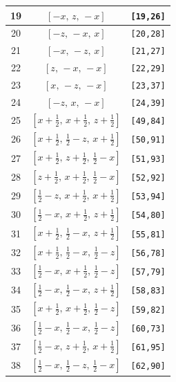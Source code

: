 \documentclass[fleqn,8pt]{jsarticle}
\begin{document}
\begin{longtable}{ccc}
19 & $\left[ - x,\, z,\, - x \right]$ & {\tt [19,26]} \\ \hline
20 & $\left[ - z,\, - x,\, x \right]$ & {\tt [20,28]} \\ \hline
21 & $\left[ - x,\, - z,\, x \right]$ & {\tt [21,27]} \\ \hline
22 & $\left[ z,\, - x,\, - x \right]$ & {\tt [22,29]} \\ \hline
23 & $\left[ x,\, - z,\, - x \right]$ & {\tt [23,37]} \\ \hline
24 & $\left[ - z,\, x,\, - x \right]$ & {\tt [24,39]} \\ \hline
25 & $\left[ x + \frac{1}{2},\, x + \frac{1}{2},\, z + \frac{1}{2} \right]$ & {\tt [49,84]} \\ \hline
26 & $\left[ x + \frac{1}{2},\, \frac{1}{2} - z,\, x + \frac{1}{2} \right]$ & {\tt [50,91]} \\ \hline
27 & $\left[ x + \frac{1}{2},\, z + \frac{1}{2},\, \frac{1}{2} - x \right]$ & {\tt [51,93]} \\ \hline
28 & $\left[ z + \frac{1}{2},\, x + \frac{1}{2},\, \frac{1}{2} - x \right]$ & {\tt [52,92]} \\ \hline
29 & $\left[ \frac{1}{2} - z,\, x + \frac{1}{2},\, x + \frac{1}{2} \right]$ & {\tt [53,94]} \\ \hline
30 & $\left[ \frac{1}{2} - x,\, x + \frac{1}{2},\, z + \frac{1}{2} \right]$ & {\tt [54,80]} \\ \hline
31 & $\left[ x + \frac{1}{2},\, \frac{1}{2} - x,\, z + \frac{1}{2} \right]$ & {\tt [55,81]} \\ \hline
32 & $\left[ x + \frac{1}{2},\, \frac{1}{2} - x,\, \frac{1}{2} - z \right]$ & {\tt [56,78]} \\ \hline
33 & $\left[ \frac{1}{2} - x,\, x + \frac{1}{2},\, \frac{1}{2} - z \right]$ & {\tt [57,79]} \\ \hline
34 & $\left[ \frac{1}{2} - x,\, \frac{1}{2} - x,\, z + \frac{1}{2} \right]$ & {\tt [58,83]} \\ \hline
35 & $\left[ x + \frac{1}{2},\, x + \frac{1}{2},\, \frac{1}{2} - z \right]$ & {\tt [59,82]} \\ \hline
36 & $\left[ \frac{1}{2} - x,\, \frac{1}{2} - x,\, \frac{1}{2} - z \right]$ & {\tt [60,73]} \\ \hline
37 & $\left[ \frac{1}{2} - x,\, z + \frac{1}{2},\, x + \frac{1}{2} \right]$ & {\tt [61,95]} \\ \hline
38 & $\left[ \frac{1}{2} - x,\, \frac{1}{2} - z,\, \frac{1}{2} - x \right]$ & {\tt [62,90]} \\ \hline

\end{longtable}
\end{document}
